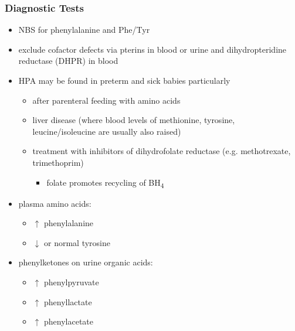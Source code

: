 \documentclass{scrartcl}
\begin{document}
\subsubsection{Diagnostic Tests}
\label{sec:orgd281aab}
\begin{itemize}
\item NBS for phenylalanine and Phe/Tyr
\item exclude cofactor defects via pterins in blood or urine and
dihydropteridine reductase (DHPR) in blood
\item HPA may be found in preterm and sick babies particularly
\begin{itemize}
\item after parenteral feeding with amino acids
\item liver disease (where blood levels of methionine, tyrosine,
leucine/isoleucine are usually also raised)
\item treatment with inhibitors of dihydrofolate reductase (e.g. methotrexate, trimethoprim)
\begin{itemize}
\item folate promotes recycling of BH\textsubscript{4}
\end{itemize}
\end{itemize}
\item plasma amino acids:
\begin{itemize}
\item \(\uparrow\) phenylalanine
\item \(\downarrow\) or normal tyrosine
\end{itemize}
\item phenylketones on urine organic acids:
\begin{itemize}
\item \(\uparrow\) phenylpyruvate
\item \(\uparrow\) phenyllactate
\item \(\uparrow\) phenylacetate
\end{itemize}
\end{itemize}
\end{document}
